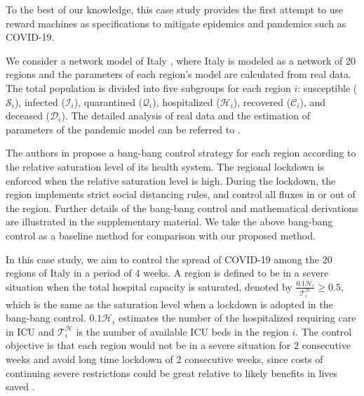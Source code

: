 \documentclass[conf]{new-aiaa}
\begin{document}
To the best of our knowledge, this case study provides the first attempt to use reward machines as specifications to mitigate epidemics and pandemics such as COVID-19.

We consider a network model of Italy \cite{della2020intermittent}, where Italy is modeled as a network of 20 regions and the parameters of each region's model are calculated from real data. The total population is divided into five subgroups for each region $i$: susceptible ($\mathcal{S}_i$), infected ($\mathcal{I}_i$), quarantined ($\mathcal{Q}_i$), hospitalized ($\mathcal{H}_i$), recovered ($\mathcal{C}_i$), and deceased ($\mathcal{D}_i$). The detailed analysis of real data and the estimation of parameters of the pandemic model can be referred to \cite{della2020intermittent}.


The authors in \cite{della2020intermittent} propose a bang-bang control strategy for each region according to the relative saturation level of its health system. The regional lockdown is enforced when the relative saturation level is high. During the lockdown, the region implements strict social distancing rules, and control all fluxes in or out of the region. Further details of the bang-bang control and mathematical derivations are illustrated in the supplementary material. We take the above bang-bang control as a baseline method for comparison with our proposed method.

In this case study, we aim to control the spread of COVID-19 among the 20 regions of Italy in a period of 4 weeks. A region is defined to be in a severe situation when the total hospital capacity is saturated, denoted by $\frac{0.1\mathcal{H}_i}{\mathcal{T}_i^\mathcal{H}} \ge 0.5$, which is the same as the saturation level when a lockdown is adopted in the bang-bang control. $0.1\mathcal{H}_i$ estimates the number of the hospitalized requiring care in ICU and $\mathcal{T}_i^\mathcal{H}$ is the number of available ICU beds in the region $i$. The control objective is that each region would not be in a severe situation for 2 consecutive weeks and avoid long time lockdown of 2 consecutive weeks, since costs of continuing severe restrictions could be great relative to likely benefits in lives saved \cite{miles2021stay}. 
\end{document}
